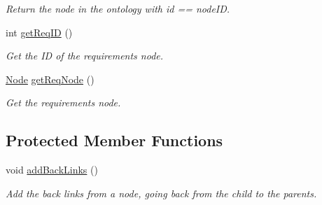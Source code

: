 \begin{DoxyCompactItemize}
\begin{DoxyCompactList}\small\item\em \-Return the node in the ontology with id == node\-I\-D. \end{DoxyCompactList}\item 
\hypertarget{classOntology_ade0d3212c973d83ea30b17107535e3ee}{int \hyperlink{classOntology_ade0d3212c973d83ea30b17107535e3ee}{get\-Req\-I\-D} ()}\label{classOntology_ade0d3212c973d83ea30b17107535e3ee}

\begin{DoxyCompactList}\small\item\em \-Get the \-I\-D of the requirements node. \end{DoxyCompactList}\item 
\hypertarget{classOntology_abda256bb621aaf495cc4b691fdcf150f}{\hyperlink{classNode}{\-Node} \hyperlink{classOntology_abda256bb621aaf495cc4b691fdcf150f}{get\-Req\-Node} ()}\label{classOntology_abda256bb621aaf495cc4b691fdcf150f}

\begin{DoxyCompactList}\small\item\em \-Get the requirements node. \end{DoxyCompactList}\end{DoxyCompactItemize}
\subsection*{\-Protected \-Member \-Functions}
\begin{DoxyCompactItemize}
\item 
\hypertarget{classOntology_af980f46f938fd78dbfe1f60f091f1833}{void \hyperlink{classOntology_af980f46f938fd78dbfe1f60f091f1833}{add\-Back\-Links} ()}\label{classOntology_af980f46f938fd78dbfe1f60f091f1833}

\begin{DoxyCompactList}\small\item\em \-Add the back links from a node, going back from the child to the parents. \end{DoxyCompactList}\end{DoxyCompactItemize}
